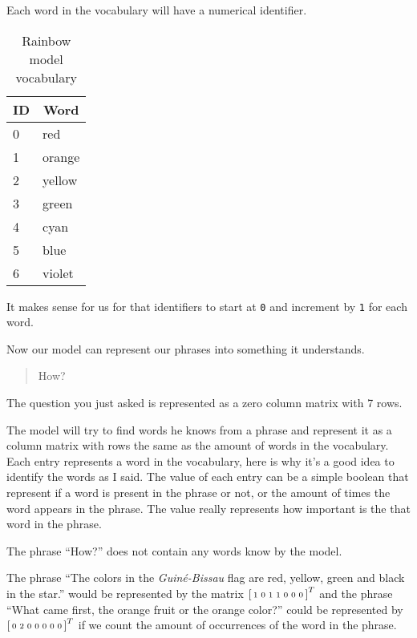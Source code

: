 \documentclass[a4paper,12pt]{article}
\theoremstyle{mytheoremstyle}
\theoremstyle{mytheoremstyle}
\theoremstyle{myproblemstyle}
\begin{document}
    Each word in the vocabulary will have a numerical identifier.

    \begin{table}
        \caption{Rainbow model vocabulary}\label{tab:rainbow_model_vocab}
        \begin{center}
            \begin{tabular}[c]{l|l}
                \hline
                \multicolumn{1}{c|}{\textbf{ID}} &
                \multicolumn{1}{c}{\textbf{Word}} \\
                \hline
                0 & red \\
                1 & orange \\
                2 & yellow \\
                3 & green \\
                4 & cyan \\
                5 & blue \\
                6 & violet \\

                \hline
            \end{tabular}
        \end{center}
    \end{table}

    It makes sense for us for that identifiers to start at \texttt{0} and
    increment by \texttt{1} for each word.

    Now our model can represent our phrases into something it understands.

    \begin{quote}
        How?
    \end{quote}

    The question you just asked is represented as a zero column matrix with 7
    rows.

    The model will try to find words he knows from a phrase and represent it as
    a column matrix with rows the same as the amount of words in the
    vocabulary. Each entry represents a word in the vocabulary, here is why
    it's a good idea to identify the words as I said. The value of each entry
    can be a simple boolean that represent if a word is present in the phrase
    or not, or the amount of times the word appears in the phrase. The value
    really represents how important is the that word in the phrase.

    The phrase ``How?'' does not contain any words know by the model.

    The phrase ``The colors in the \textit{Guiné-Bissau} flag are red, yellow,
    green and black in the star.'' would be represented by the matrix
    $\begin{bsmallmatrix}1&0&1&1&0&0&0\end{bsmallmatrix}^T$ and the phrase
    ``What came first, the orange fruit or the orange color?'' could be
    represented by $\begin{bsmallmatrix}0&2&0&0&0&0&0\end{bsmallmatrix}^T$ if
    we count the amount of occurrences of the word in the phrase.
\end{document}
